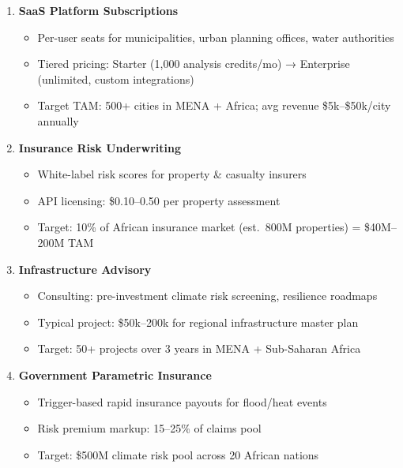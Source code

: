 \documentclass[11pt, a4paper]{article}
\begin{document}
\begin{enumerate}[label=\arabic*., leftmargin=1.5em, itemsep=6pt]

\item \textbf{SaaS Platform Subscriptions}
  \begin{itemize}[noitemsep, leftmargin=1em, font=\small]
    \item Per-user seats for municipalities, urban planning offices, water authorities
    \item Tiered pricing: Starter (1,000 analysis credits/mo) → Enterprise (unlimited, custom integrations)
    \item Target TAM: 500+ cities in MENA + Africa; avg revenue \$5k–\$50k/city annually
  \end{itemize}

\item \textbf{Insurance Risk Underwriting}
  \begin{itemize}[noitemsep, leftmargin=1em, font=\small]
    \item White-label risk scores for property \& casualty insurers
    \item API licensing: \$0.10–0.50 per property assessment
    \item Target: 10\% of African insurance market (est.~800M properties) = \$40M–200M TAM
  \end{itemize}

\item \textbf{Infrastructure Advisory}
  \begin{itemize}[noitemsep, leftmargin=1em, font=\small]
    \item Consulting: pre-investment climate risk screening, resilience roadmaps
    \item Typical project: \$50k–200k for regional infrastructure master plan
    \item Target: 50+ projects over 3 years in MENA + Sub-Saharan Africa
  \end{itemize}

\item \textbf{Government Parametric Insurance}
  \begin{itemize}[noitemsep, leftmargin=1em, font=\small]
    \item Trigger-based rapid insurance payouts for flood/heat events
    \item Risk premium markup: 15–25\% of claims pool
    \item Target: \$500M climate risk pool across 20 African nations
  \end{itemize}

\end{enumerate}
\end{document}
